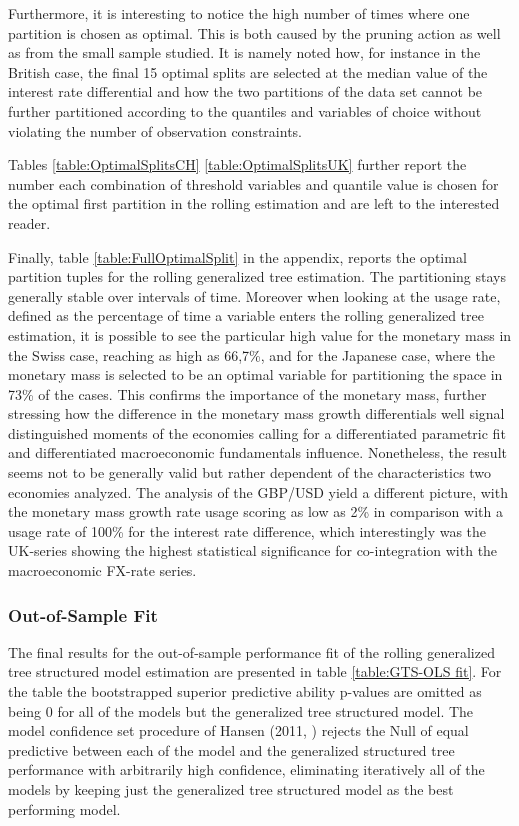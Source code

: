 Furthermore, it is interesting to notice the high number of times
where one partition is chosen as optimal. This is both caused by the
pruning action as well as from the small sample studied. It is namely
noted how, for instance in the British case, the final 15 optimal
splits are selected at the median value of the interest rate
differential and how the two partitions of the data set cannot be
further partitioned according to the quantiles and variables of choice
without violating the number of observation constraints.

Tables \ref{table:OptimalSplitsCH}\textendash
\ref{table:OptimalSplitsUK} further report the number each combination
of threshold variables and quantile value is chosen for the optimal
first partition in the rolling estimation and are left to the
interested reader.

Finally, table \ref{table:FullOptimalSplit} in the appendix, reports
the optimal partition tuples for the rolling generalized tree
estimation. The partitioning stays generally stable over intervals of
time. Moreover when looking at the usage rate, defined as the
percentage of time a variable enters the rolling generalized tree
estimation, it is possible to see the particular high value for the
monetary mass in the Swiss case, reaching as high as 66,7\%, and for
the Japanese case, where the monetary mass is selected to be an
optimal variable for partitioning the space in 73\% of the cases. This
confirms the importance of the monetary mass, further stressing how
the difference in the monetary mass growth differentials well signal
distinguished moments of the economies calling for a differentiated
parametric fit and differentiated macroeconomic fundamentals influence.
Nonetheless, the result seems not to be generally valid but rather
dependent of the characteristics two economies analyzed. The analysis
of the GBP/USD yield a different picture, with the monetary mass
growth rate usage scoring as low as 2\% in comparison with a usage
rate of 100\% for the interest rate difference, which interestingly
was the UK-series showing the highest statistical significance for
co-integration with the macroeconomic FX-rate series.

\subsubsection{Out-of-Sample Fit}

The final results for the out-of-sample performance fit of the rolling
generalized tree structured model estimation are presented in table
\ref{table:GTS-OLS fit}. For the table the bootstrapped superior
predictive ability p-values are omitted as being 0 for all of the
models but the generalized tree structured model. The model confidence
set procedure of Hansen (2011, \cite{HansenMCS}) rejects the Null of
equal predictive between each of the model and the generalized
structured tree performance with arbitrarily high confidence, eliminating
iteratively all of the models by keeping just the generalized tree
structured model as the best performing model.

